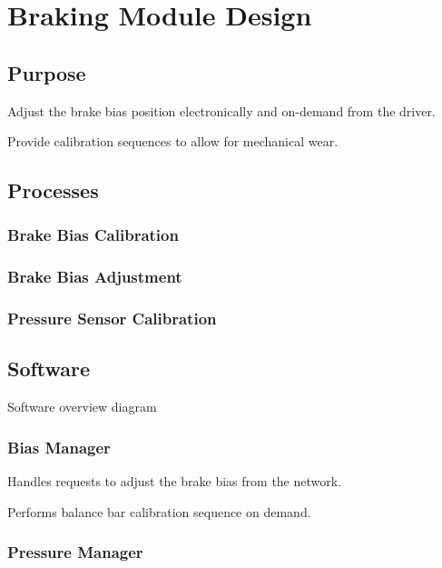\section{Braking Module Design\label{sec:Braking-Module-Design}}


\subsection{Purpose}

Adjust the brake bias position electronically and on-demand from the
driver.

Provide calibration sequences to allow for mechanical wear.


\subsection{Processes}


\subsubsection{Brake Bias Calibration}


\subsubsection{Brake Bias Adjustment}


\subsubsection{Pressure Sensor Calibration}


\subsection{Software}

Software overview diagram


\subsubsection{Bias Manager}

Handles requests to adjust the brake bias from the network. 

Performs balance bar calibration sequence on demand.


\subsubsection{Pressure Manager}

